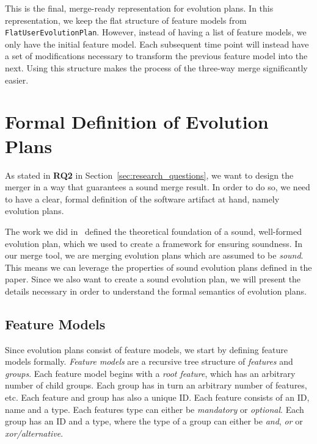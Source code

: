 \documentclass[a4paper,english]{ifimaster}
\begin{document}
This is the final, merge-ready representation for evolution plans. In this representation, we keep the flat structure of feature models from \texttt{Flat\-User\-Evolution\-Plan}. However, instead of having a list of feature models, we only have the initial feature model. Each subsequent time point will instead have a set of modifications necessary to transform the previous feature model into the next. Using this structure makes the process of the three-way merge significantly easier.

\section{Formal Definition of Evolution Plans}%
\label{sec:formal_definition_of_evolution_plans}

As stated in \textbf{RQ2} in Section~\vref{sec:research_questions}, we want to design the merger in a way that guarantees a sound merge result. In order to do so, we need to have a clear, formal definition of the software artifact at hand, namely evolution plans.

The work we did in~\cite{cite:consistency_preserving_evolution_planning} defined the theoretical foundation of a sound, well-formed evolution plan, which we used to create a framework for ensuring soundness. In our merge tool, we are merging evolution plans which are assumed to be \textit{sound}. This means we can leverage the properties of sound evolution plans defined in the paper. Since we also want to create a sound evolution plan, we will present the details necessary in order to understand the formal semantics of evolution plans.

\subsection{Feature Models}%
\label{sub:feature_models}

Since evolution plans consist of feature models, we start by defining feature models formally. \textit{Feature models} are a recursive tree structure of \textit{features} and \textit{groups}. Each feature model begins with a \textit{root feature}, which has an arbitrary number of child groups. Each group has in turn an arbitrary number of features, etc. Each feature and group has also a unique ID. Each feature consists of an ID, name and a type. Each features type can either be \textit{mandatory} or \textit{optional}. Each group has an ID and a type, where the type of a group can either be \textit{and}, \textit{or} or \textit{xor/alternative}.
\end{document}
